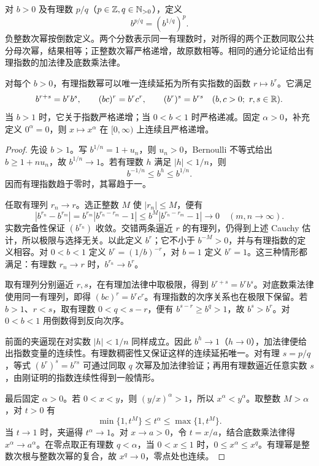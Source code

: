 对 \(b>0\) 及有理数 \(p/q\)（\(p\in\mathbb Z,q\in\mathbb{N}_{>0}\)），定义
\[
 b^{p/q}=(b^{1/q})^p.
\]
负整数次幂按倒数定义。两个分数表示同一有理数时，对所得的两个正数同取公共分母次幂，结果相等；正整数次幂严格递增，故原数相等。相同的通分论证给出有理指数的加法律及底数乘法律。

\begin{proposition}[实指数幂]
\label{prop:positive-real-powers}
对每个 \(b>0\)，有理指数幂可以唯一连续延拓为所有实指数的函数 \(r\mapsto b^r\)。它满足
\[
 b^{r+s}=b^rb^s,\qquad (bc)^r=b^rc^r,\qquad (b^r)^s=b^{rs}
 \quad(b,c>0;\ r,s\in\mathbb{R}).
\]
当 \(b>1\) 时，它关于指数严格递增；当 \(0<b<1\) 时严格递减。固定 \(\alpha>0\)，补充定义 \(0^\alpha=0\)，则 \(x\mapsto x^\alpha\) 在 \([0,\infty)\) 上连续且严格递增。
\end{proposition}

\begin{proof}
先设 \(b>1\)。写 \(b^{1/n}=1+u_n\)，则 \(u_n>0\)，Bernoulli 不等式给出 \(b\ge1+nu_n\)，故 \(b^{1/n}\to1\)。若有理数 \(h\) 满足 \(|h|<1/n\)，则
\[
 b^{-1/n}\le b^h\le b^{1/n}.
\]
因而有理指数趋于零时，其幂趋于一。

任取有理列 \(r_n\to r\)。选正整数 \(M\) 使 \(|r_n|\le M\)，便有
\[
 |b^{r_n}-b^{r_m}|=b^{r_m}|b^{r_n-r_m}-1|
 \le b^M|b^{r_n-r_m}-1|\longrightarrow0
 \quad(m,n\to\infty).
\]
实数完备性保证 \((b^{r_n})\) 收敛。交错两条逼近 \(r\) 的有理列，仍得到上述 Cauchy 估计，所以极限与选择无关。以此定义 \(b^r\)；它不小于 \(b^{-M}>0\)，并与有理指数的定义相容。对 \(0<b<1\) 定义 \(b^r=(1/b)^{-r}\)，对 \(b=1\) 定义 \(b^r=1\)。这三种情形都满足：有理数 \(r_n\to r\) 时，\(b^{r_n}\to b^r\)。

取有理列分别逼近 \(r,s\)，在有理加法律中取极限，得到 \(b^{r+s}=b^rb^s\)。对底数乘法律使用同一有理列，即得 \((bc)^r=b^rc^r\)。有理指数的次序关系也在极限下保留。若 \(b>1\)、\(r<s\)，取有理数 \(0<q<s-r\)，便有 \(b^{s-r}\ge b^q>1\)，故 \(b^s>b^r\)。对 \(0<b<1\) 用倒数得到反向次序。

前面的夹逼现在对实数 \(|h|<1/n\) 同样成立。因此 \(b^h\to1\)（\(h\to0\)），加法律便给出指数变量的连续性。有理数稠密性又保证这样的连续延拓唯一。对有理 \(s=p/q\)，等式 \((b^r)^s=b^{rs}\) 可通过同取 \(q\) 次幂及加法律验证；再用有理数逼近任意实数 \(s\)，由刚证明的指数连续性得到一般情形。

最后固定 \(\alpha>0\)。若 \(0<x<y\)，则 \((y/x)^\alpha>1\)，所以 \(x^\alpha<y^\alpha\)。取整数 \(M>\alpha\)，对 \(t>0\) 有
\[
 \min\{1,t^M\}\le t^\alpha\le\max\{1,t^M\}.
\]
当 \(t\to1\) 时，夹逼得 \(t^\alpha\to1\)。对 \(x\to a>0\)，令 \(t=x/a\)，结合底数乘法律得 \(x^\alpha\to a^\alpha\)。在零点取正有理数 \(q<\alpha\)，当 \(0<x\le1\) 时，\(0\le x^\alpha\le x^q\)。有理幂是整数次根与整数次幂的复合，故 \(x^q\to0\)，零点处也连续。
\end{proof}


